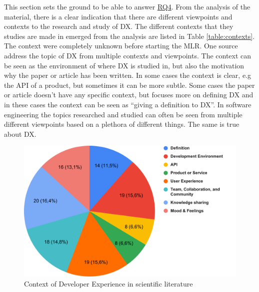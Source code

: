 \documentclass[english, 12pt, a4paper, sci, utf8, a-1b, online]{aaltothesis}
\begin{document}
This section sets the ground to be able to answer \hyperref[RQ4]{RQ4}. From the analysis of the material, there is a clear indication that there are different viewpoints and contexts to the research and study of DX. The different contexts that they studies are made in emerged from the analysis are listed in Table \ref{table:contexts}. The context were completely unknown before starting the MLR. One source address the topic of DX from multiple contexts and viewpoints. The context can be seen as the environment of where DX is studied in, but also the motivation why the paper or article has been written. In some cases the context is clear, e.g the API of a product, but sometimes it can be more subtle. Some cases the paper or article doesn't have any specific context, but focuses more on defining DX and in these cases the context can be seen as ``giving a definition to DX''. In software engineering the topics researched and studied can often be seen from multiple different viewpoints based on a plethora of different things. The same is true about DX.

\begin{figure}[h]
  \begin{center}
    \includegraphics[width=\textwidth]{context-scientific.pdf}
    \captionsetup{width=0.6\textwidth}
    \caption{Context of Developer Experience in scientific literature}
  \end{center}
\end{figure}
\end{document}
